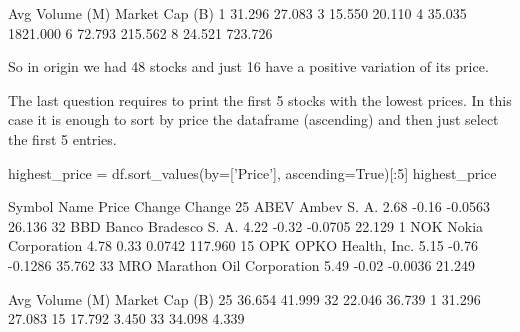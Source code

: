 \begin{solution}
\begin{ipython}
   Avg Volume (M)  Market Cap (B)
1          31.296          27.083
3          15.550          20.110
4          35.035        1821.000
6          72.793         215.562
8          24.521         723.726
\end{ipython}
        
So in origin we had 48 stocks and just 16 have a positive variation of its price.

The last question requires to print the first 5 stocks with the lowest prices. In this case it is enough to sort by price the dataframe (ascending) and then just select the first 5 entries.

\begin{ipython}
highest_price = df.sort_values(by=['Price'], ascending=True)[:5]
highest_price

   Symbol                      Name  Price  Change  Change%
25   ABEV               Ambev S. A.   2.68   -0.16  -0.0563      26.136
32    BBD      Banco Bradesco S. A.   4.22   -0.32  -0.0705      22.129
1     NOK         Nokia Corporation   4.78    0.33   0.0742     117.960
15    OPK         OPKO Health, Inc.   5.15   -0.76  -0.1286      35.762
33    MRO  Marathon Oil Corporation   5.49   -0.02  -0.0036      21.249

    Avg Volume (M)  Market Cap (B)
25          36.654          41.999
32          22.046          36.739
1           31.296          27.083
15          17.792           3.450
33          34.098           4.339
\end{ipython}
\end{solution}

